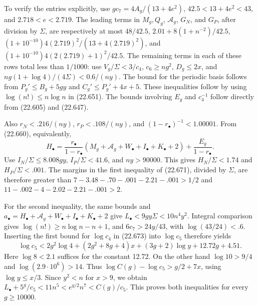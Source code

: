 \documentclass[
  11pt,
  a4paper,
]{article}
\begin{document}
To verify the entries explicitly, use \(g c_7=4A_g/(13+4e^2)\),
\(42.5<13+4e^2<43\), and \(2.718<e<2.719\). The leading terms in
\(M_g,Q_g\), \(\mathcal A_g\), \(G_N\), and \(G_P\), after division by
\(\Sigma\), are respectively at most \(48/42.5\),
\(2.01+8(1+n^{-2})/42.5\), \((1+10^{-10})4(2.719)^2/(13+4(2.719)^2)\),
and \((1+10^{-10})4(2(2.719)+1)^2/42.5\). The remaining terms in each of
these rows total less than \(1/1000\): use \(V_g/\Sigma<3/c_4\),
\(c_6\ge ng^2\), \(D_g\le2x\), and \(n g(1+\log4)/(4\Sigma)<0.6/(ny)\).
The bound for the periodic basis follows from \(P_g'\le B_g+5gy\) and
\(C_g'\le P_g'+4x+5\). These inequalities follow by using
\(\log(n!)\le n\log n\) in (22.651). The bounds involving \(E_g\) and
\(c_4^{-1}\) follow directly from (22.605) and (22.647).

Also \(r_N<.216/(ny)\), \(r_P<.108/(ny)\), and
\((1-r_\bullet)^{-1}<1.00001\). From (22.660), equivalently, \[
 H_\bullet=
 \frac{r_\bullet}{1-r_\bullet}
  (M_g+\mathcal A_g+W_\bullet+I_\bullet+K_\bullet+2)
 +\frac{E_g}{1-r_\bullet}.
 \tag{22.674}
\] Use \(I_N/\Sigma\le8.008gy\), \(I_P/\Sigma<41.6\), and \(ny>90000\).
This gives \(H_N/\Sigma<1.74\) and \(H_P/\Sigma<.001\). The margins in
the first inequality of (22.671), divided by \(\Sigma\), are therefore
greater than \(7-3.48-.70-.001-2.21-.001>1/2\) and
\(11-.002-4-2.02-2.21-.001>2\).

For the second inequality, the same bounds and
\(a_\bullet=H_\bullet+\mathcal A_g+W_\bullet+
I_\bullet+K_\bullet+2\) give \(L_\bullet<9gy\Sigma<10n^4y^2\). Integral
comparison gives \(\log(n!)\ge n\log n-n+1\), and \(6c_7>24y/43\), with
\(\log(43/24)<.6\). Inserting the first bound for \(\log c_4\) in
(22.673) into \(\log c_5\) therefore yields \[
 \log c_5<2g^2\log4+(2g^2+8g+4)x
                 +(3g+2)\log y+12.72g+4.51.
 \tag{22.675}
\] Here \(\log8<2.1\) suffices for the constant 12.72. On the other hand
\(\log10>9/4\) and \(\log(2.9\cdot10^6)>14\). Thus
\(\log C(g)-\log c_5>g/2+7x\), using \(\log y\le x/3\). Since \(y^2<n\)
for \(x>9\), we obtain \(L_\bullet+5^g/c_5<11n^5<e^{g/2}n^7<C(g)/c_5\).
This proves both inequalities for every \(g\ge10000\).
\end{document}
